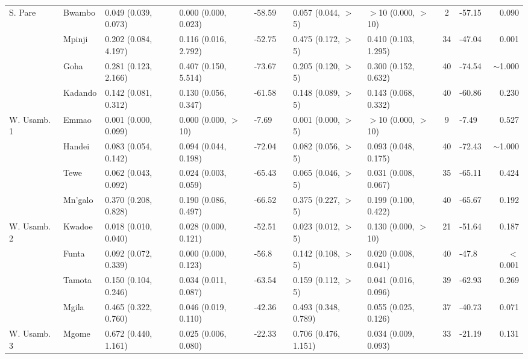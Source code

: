 \begin{tabular}{llllllllclr}
\cmidrule{2-11}
S. Pare     & Bwambo         & 0.049 (0.039, 0.073)   & 0.000 (0.000, 0.023)   & -58.59   & &   0.057 (0.044, $>$5)    & $>$10 (0.000, $>$10)   & 2    & -57.15  &  0.090  \\
            & Mpinji         & 0.202 (0.084, 4.197)   & 0.116 (0.016, 2.792)   & -52.75   & &   0.475 (0.172, $>$5)    & 0.410 (0.103, 1.295)   & 34   & -47.04  &  0.001  \\
            & Goha           & 0.281 (0.123, 2.166)   & 0.407 (0.150, 5.514)   & -73.67   & &   0.205 (0.120, $>$5)    & 0.300 (0.152, 0.632)   & 40   & -74.54  &  $\sim$1.000  \\
            & Kadando        & 0.142 (0.081, 0.312)   & 0.130 (0.056, 0.347)   & -61.58   & &   0.148 (0.089, $>$5)    & 0.143 (0.068, 0.332)   & 40   & -60.86  &  0.230  \\
\cmidrule{2-11}
W. Usamb. 1 & Emmao          & 0.001 (0.000, 0.099)   & 0.000 (0.000, $>$10)   & -7.69    & &   0.001 (0.000, $>$5)    & $>$10 (0.000, $>$10)   & 9    & -7.49   &  0.527  \\
            & Handei         & 0.083 (0.054, 0.142)   & 0.094 (0.044, 0.198)   & -72.04   & &   0.082 (0.056, $>$5)    & 0.093 (0.048, 0.175)   & 40   & -72.43  &  $\sim$1.000  \\
            & Tewe           & 0.062 (0.043, 0.092)   & 0.024 (0.003, 0.059)   & -65.43   & &   0.065 (0.046, $>$5)    & 0.031 (0.008, 0.067)   & 35   & -65.11  &  0.424  \\
            & Mn'galo        & 0.370 (0.208, 0.828)   & 0.190 (0.086, 0.497)   & -66.52   & &   0.375 (0.227, $>$5)    & 0.199 (0.100, 0.422)   & 40   & -65.67  &  0.192  \\
\cmidrule{2-11}
W. Usamb. 2 & Kwadoe         & 0.018 (0.010, 0.040)   & 0.028 (0.000, 0.121)   & -52.51   & &   0.023 (0.012, $>$5)    & 0.130 (0.000, $>$10)   & 21   & -51.64  &  0.187  \\
            & Funta          & 0.092 (0.072, 0.339)   & 0.000 (0.000, 0.123)   & -56.8    & &   0.142 (0.108, $>$5)    & 0.020 (0.008, 0.041)   & 40   & -47.8   &  $<$0.001  \\
            & Tamota         & 0.150 (0.104, 0.246)   & 0.034 (0.011, 0.087)   & -63.54   & &   0.159 (0.112, $>$5)    & 0.041 (0.016, 0.096)   & 39   & -62.93  &  0.269  \\
            & Mgila          & 0.465 (0.322, 0.760)   & 0.046 (0.019, 0.110)   & -42.36   & &   0.493 (0.348, 0.789)   & 0.055 (0.025, 0.126)   & 37   & -40.73  &  0.071  \\
\cmidrule{2-11}
W. Usamb. 3 & Mgome          & 0.672 (0.440, 1.161)   & 0.025 (0.006, 0.080)   & -22.33   & &   0.706 (0.476, 1.151)   & 0.034 (0.009, 0.093)   & 33   & -21.19  &  0.131  \\
\bottomrule
\end{tabular}